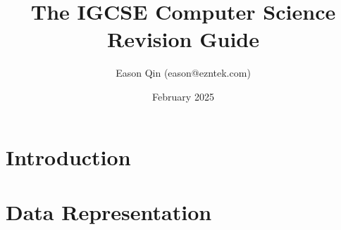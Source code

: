 \documentclass[a4paper, oneside, 11pt]{book} %
\title{The IGCSE Computer Science Revision Guide}
\author{Eason Qin (eason@ezntek.com)}
\date{February 2025}
\begin{document}
\maketitle
\label{table-of-contents}
\tableofcontents

\chapter*{Introduction}
\label{introduction}


\chapter{Data Representation}

\end{document}
